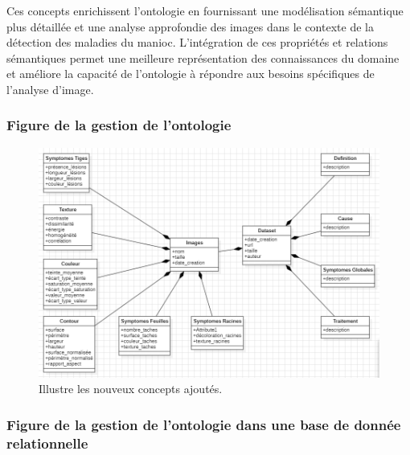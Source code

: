 \documentclass{article}
\begin{document}
	Ces concepts enrichissent l'ontologie en fournissant une modélisation sémantique plus détaillée et une analyse approfondie des images dans le contexte de la détection des maladies du manioc. L'intégration de ces propriétés et relations sémantiques permet une meilleure représentation des connaissances du domaine et améliore la capacité de l'ontologie à répondre aux besoins spécifiques de l'analyse d'image.
	
	\subsubsection*{Figure de la gestion de l'ontologie}
	
	\begin{figure}[H]
		\begin{center}
			\begin{minipage}[b]{1\textwidth}
				\centering
				\includegraphics[width=\textwidth]{img/Diagramme.png}
			\end{minipage}
			\caption{Illustre les nouveux concepts ajoutés.}
		\end{center}
	\end{figure}
	
	\subsubsection*{Figure de la gestion de l'ontologie dans une base de donnée relationnelle}
	
\end{document}
